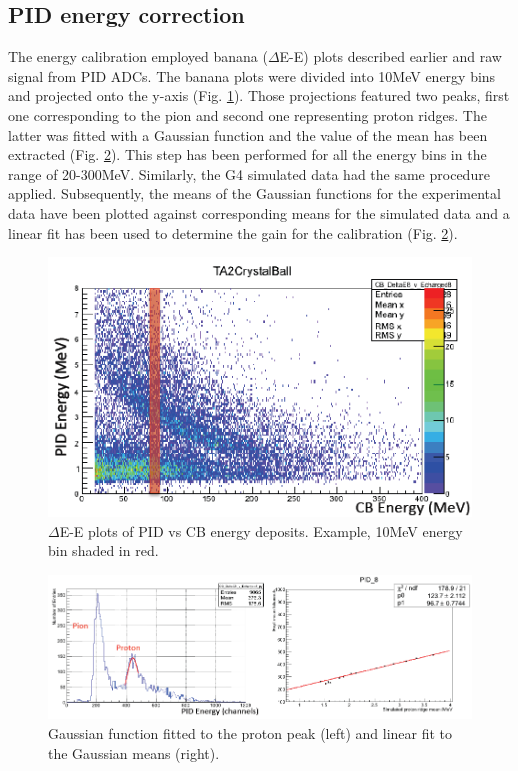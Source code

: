 \subsection{PID energy correction}

\indent The energy calibration employed banana ($\Delta$E-E) plots described earlier and raw signal from PID ADCs. The banana plots were divided into 10MeV energy bins and projected onto the y-axis (Fig. \ref{bananacali}). Those projections featured two peaks, first one corresponding to the pion and second one representing proton ridges. The latter was fitted with a Gaussian function and the value of the mean has been extracted (Fig. \ref{bananagaus}). This step has been performed for all the energy bins in the range of 20-300MeV. Similarly, the G4 simulated data had the same procedure applied. Subsequently, the means of the Gaussian functions for the experimental data have been plotted against corresponding means for the simulated data and a linear fit has been used to determine the gain for the calibration (Fig. \ref{bananagaus}).

\begin{figure}[H]
\begin{center}
\includegraphics[scale=0.6]{pictures/png/bananacali.png}
\caption{$\Delta$E-E plots of PID vs CB energy deposits. Example, 10MeV energy bin shaded in red.}
\label{bananacali}
\end{center}
\end{figure}

\begin{figure}[H]
\begin{center}
\includegraphics[scale=0.5]{pictures/png/bananagaus.png}
\caption{Gaussian function fitted to the proton peak (left) and linear fit to the Gaussian means (right).}
\label{bananagaus}
\end{center}
\end{figure}

